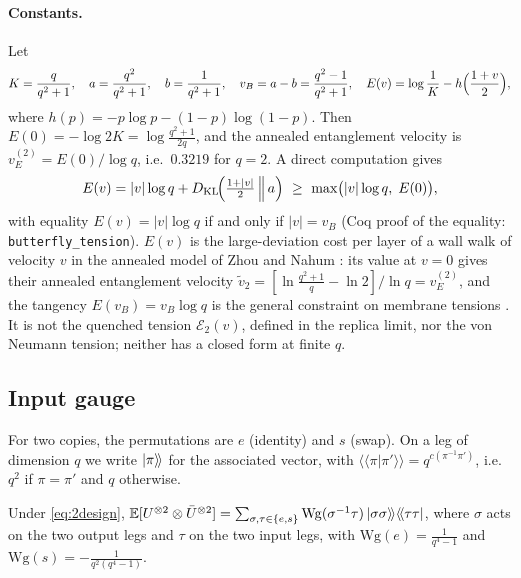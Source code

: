 \paragraph{Constants.} Let
\begin{equation}
K=\frac{q}{q^2+1},\quad a=\frac{q^2}{q^2+1},\quad b=\frac{1}{q^2+1},\quad v_B=a-b=\frac{q^2-1}{q^2+1},\quad E(v)=\log\frac1K-h\Bigl(\frac{1+v}2\Bigr),
\end{equation}
where $h(p)=-p\log p-(1-p)\log(1-p)$. Then $E(0)=-\log 2K=\log\frac{q^2+1}{2q}$, and the annealed entanglement velocity is $v_E^{(2)}=E(0)/\log q$, i.e.\ $0.3219$ for $q=2$. A direct computation gives
\begin{equation}\label{eq:EKL}
E(v)=|v|\log q+D_{\mathrm{KL}}\!\Bigl(\tfrac{1+|v|}{2}\,\Big\|\,a\Bigr)\ \ge\ \max\bigl(|v|\log q,\;E(0)\bigr),
\end{equation}
with equality $E(v)=|v|\log q$ if and only if $|v|=v_B$ (Coq proof of the equality: \texttt{butterfly\_tension}). $E(v)$ is the large-deviation cost per layer of a wall walk of velocity $v$ in the annealed model of Zhou and Nahum \cite{ZhouNahum2019}: its value at $v=0$ gives their annealed entanglement velocity $\tilde v_2=[\ln\frac{q^2+1}{q}-\ln2]/\ln q=v_E^{(2)}$, and the tangency $E(v_B)=v_B\log q$ is the general constraint on membrane tensions \cite{JHN2018,ZhouNahum2019,ZhouNahum2020}. It is not the quenched tension $\mathcal E_2(v)$, defined in the replica limit, nor the von Neumann tension; neither has a closed form at finite $q$.

\subsection{Input gauge}

For two copies, the permutations are $e$ (identity) and $s$ (swap). On a leg of dimension $q$ we write $|\pi\rangle\!\rangle$ for the associated vector, with $\langle\!\langle\pi|\pi'\rangle\!\rangle=q^{c(\pi^{-1}\pi')}$, i.e.\ $q^2$ if $\pi=\pi'$ and $q$ otherwise.

\begin{lemma}\label{lem:wg}
Under \eqref{eq:2design}, $\mathbb{E}[U^{\otimes2}\otimes\bar U^{\otimes2}]=\sum_{\sigma,\tau\in\{e,s\}}\mathrm{Wg}(\sigma^{-1}\tau)\,|\sigma\sigma\rangle\!\rangle\langle\!\langle \tau\tau|$, where $\sigma$ acts on the two output legs and $\tau$ on the two input legs, with $\mathrm{Wg}(e)=\frac{1}{q^4-1}$ and $\mathrm{Wg}(s)=-\frac{1}{q^2(q^4-1)}$.
\end{lemma}

